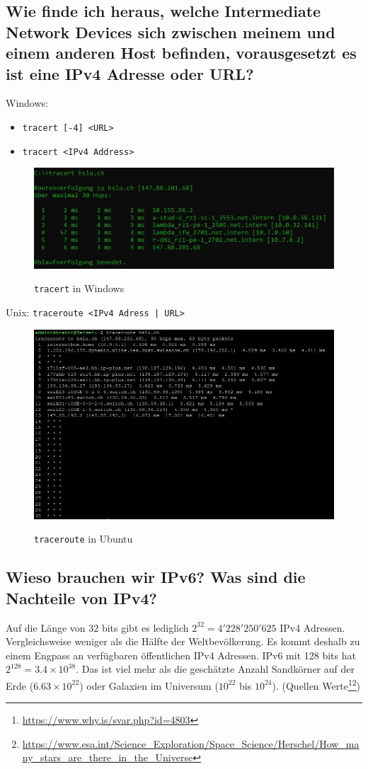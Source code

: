 \subsection*{Wie finde ich heraus, welche Intermediate Network Devices sich zwischen meinem und einem anderen Host befinden, vorausgesetzt es ist eine IPv4 Adresse oder URL?}
\begin{multicols}{2}
    Windows:
    \begin{itemize}
        \item \texttt{tracert [-4] <URL>}
        \item \texttt{tracert <IPv4 Address>}
    \end{itemize}
    \begin{figure}[H]
        \begin{center}
        \label{pic:tracert}
        \includegraphics[width=.5\textwidth]{images/tracert.jpg}
        \caption{\texttt{tracert} in Windows}
        \end{center}
    \end{figure}
    \columnbreak
    Unix: \texttt{traceroute <IPv4 Adress | URL>}
    \begin{figure}[H]
        \begin{center}
        \label{pic:traceroute}
        \includegraphics[width=.5\textwidth]{images/traceroute.jpg}
        \caption{\texttt{traceroute} in Ubuntu}
        \end{center}
    \end{figure}
\end{multicols}

\subsection*{Wieso brauchen wir IPv6? Was sind die Nachteile von IPv4?}
Auf die Länge von 32 bits gibt es lediglich $2^{32}=4'228'250'625$ IPv4 Adressen. Vergleichsweise weniger als die Hälfte der Weltbevölkerung. Es kommt deshalb zu einem Engpass an verfügbaren öffentlichen IPv4 Adressen. IPv6 mit 128 bits hat $2^{128}=3.4\times10^{38}$. Das ist viel mehr als die geschätzte Anzahl Sandkörner auf der Erde ($6.63\times10^{22}$) oder Galaxien im Universum ($10^{22}$ bis $10^{24}$). (Quellen Werte\footnote{\url{https://www.why.is/svar.php?id=4803}}\footnote{\url{https://www.esa.int/Science_Exploration/Space_Science/Herschel/How_many_stars_are_there_in_the_Universe}})

